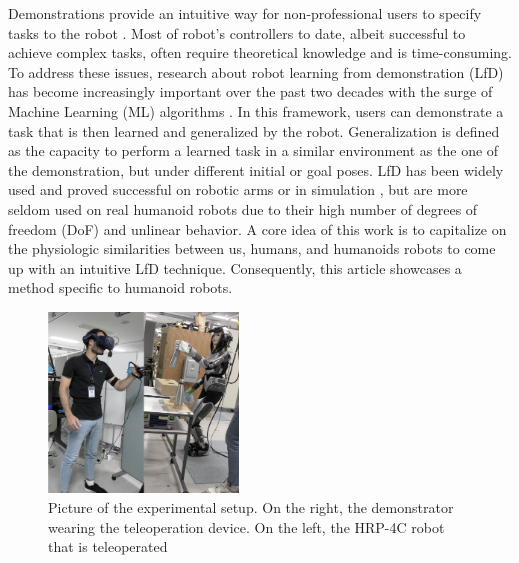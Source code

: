 \documentclass[conference]{IEEEtran}
\begin{document}
Demonstrations provide an intuitive way for non-professional users to specify tasks to the robot \cite{schaal_is_1999}. Most of robot's controllers to date, albeit successful to achieve complex tasks, often require theoretical knowledge and is time-consuming. To address these issues, research about robot learning from demonstration (LfD) has become increasingly important over the past two decades with the surge of Machine Learning (ML) algorithms \cite{argall_survey_2009} \cite{ravichandar_recent_2020}. In this framework, users can demonstrate a task that is then learned and generalized by the robot. Generalization is defined as the capacity to perform a learned task in a similar environment as the one of the demonstration, but under different initial or goal poses. LfD has been widely used and proved successful on robotic arms or in simulation \cite{pastor_learning_2009}, but are more seldom used on real humanoid robots \cite{calinon_learning_2007} due to their high number of degrees of freedom (DoF) and unlinear behavior. A core idea of this work is to capitalize on the physiologic similarities between us, humans, and humanoids robots to come up with an intuitive LfD technique. Consequently, this article showcases a method specific to humanoid robots.


\begin{figure}[t]
  \centering
  \includegraphics[width=0.45\textwidth]{img/Setup.png}
  \caption{Picture of the experimental setup. On the right, the demonstrator wearing the teleoperation device. On the left, the HRP-4C robot that is teleoperated}
  \label{fig:setup}
\end{figure}
\end{document}
